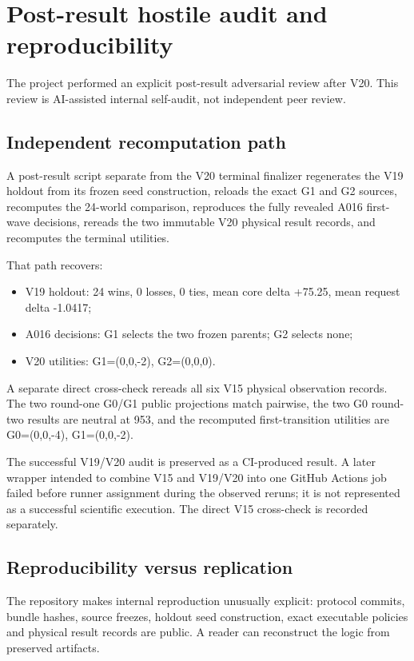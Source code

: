 \section{Post-result hostile audit and reproducibility}

The project performed an explicit post-result adversarial review after V20. This review is AI-assisted internal self-audit, not independent peer review.

\subsection{Independent recomputation path}

A post-result script separate from the V20 terminal finalizer regenerates the V19 holdout from its frozen seed construction, reloads the exact G1 and G2 sources, recomputes the 24-world comparison, reproduces the fully revealed A016 first-wave decisions, rereads the two immutable V20 physical result records, and recomputes the terminal utilities.

That path recovers:
\begin{itemize}
  \item V19 holdout: 24 wins, 0 losses, 0 ties, mean core delta +75.25, mean request delta -1.0417;
  \item A016 decisions: G1 selects the two frozen parents; G2 selects none;
  \item V20 utilities: G1=(0,0,-2), G2=(0,0,0).
\end{itemize}

A separate direct cross-check rereads all six V15 physical observation records. The two round-one G0/G1 public projections match pairwise, the two G0 round-two results are neutral at 953, and the recomputed first-transition utilities are G0=(0,0,-4), G1=(0,0,-2).

The successful V19/V20 audit is preserved as a CI-produced result. A later wrapper intended to combine V15 and V19/V20 into one GitHub Actions job failed before runner assignment during the observed reruns; it is not represented as a successful scientific execution. The direct V15 cross-check is recorded separately.

\subsection{Reproducibility versus replication}

The repository makes internal reproduction unusually explicit: protocol commits, bundle hashes, source freezes, holdout seed construction, exact executable policies and physical result records are public. A reader can reconstruct the logic from preserved artifacts.


